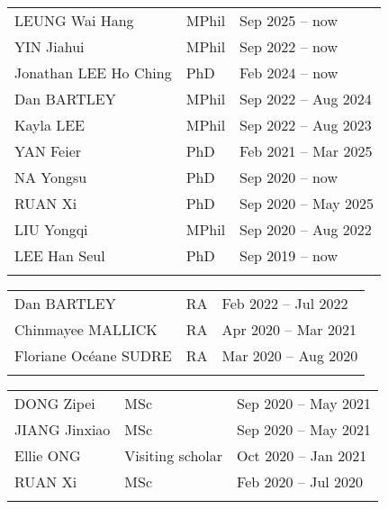 \documentclass[letterpaper]{article}
\begin{document}
\begin{tabularx}{\textwidth}{XXX}
  LEUNG Wai Hang          & MPhil & Sep 2025 -- now\\
  YIN Jiahui              & MPhil & Sep 2022 -- now\\
  Jonathan LEE Ho Ching   & PhD   & Feb 2024 -- now\\
  Dan BARTLEY             & MPhil & Sep 2022 -- Aug 2024\\
  Kayla LEE               & MPhil & Sep 2022 -- Aug 2023\\
  YAN Feier               & PhD   & Feb 2021 -- Mar 2025\\
  NA Yongsu               & PhD   & Sep 2020 -- now\\
  RUAN Xi                 & PhD   & Sep 2020 -- May 2025\\
  LIU Yongqi              & MPhil & Sep 2020 -- Aug 2022\\
  LEE Han Seul            & PhD   & Sep 2019 -- now\\
  \\
\end{tabularx}

\begin{tabularx}{\textwidth}{XXX}
  Dan BARTLEY             & RA    & Feb 2022 -- Jul 2022\\
  Chinmayee MALLICK       & RA    & Apr 2020 -- Mar 2021\\
  Floriane Oc\'eane SUDRE & RA    & Mar 2020 -- Aug 2020\\
  \\
\end{tabularx}

\begin{tabularx}{\textwidth}{XXX}
  DONG Zipei        & MSc               & Sep 2020 -- May 2021\\
  JIANG Jinxiao     & MSc               & Sep 2020 -- May 2021\\
  Ellie ONG         & Visiting scholar  & Oct 2020 -- Jan 2021\\
  RUAN Xi           & MSc               & Feb 2020 -- Jul 2020\\
  \\
\end{tabularx}
  
\end{document}
